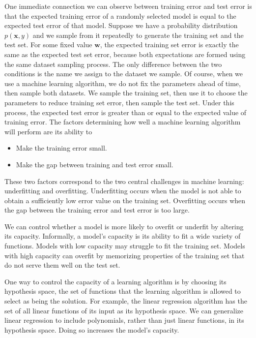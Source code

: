 One immediate connection we can observe between training error and test error is that the expected training error of a randomly selected model is equal to the expected test error of that model. Suppose we have a probability distribution $p(\boldsymbol{x}, y)$ and we sample from it repeatedly to generate the training set and the test set. For some fixed value $\boldsymbol{w}$, the expected training set error is exactly the same as the expected test set error, because both expectations are formed using the same dataset sampling process. The only difference between the two conditions is the name we assign to the dataset we sample. Of course, when we use a machine learning algorithm, we do not fix the parameters ahead of time, then sample both datasets. We sample the training set, then use it to choose the parameters to reduce training set error, then sample the test set. Under this process, the expected test error is greater than or equal to the expected value of training error. The factors determining how well a machine learning algorithm will perform are its ability to
\begin{itemize}
\item Make the training error small.
\item Make the gap between training and test error small.
\end{itemize}
These two factors correspond to the two central challenges in machine learning:
underfitting and overfitting. Underfitting occurs when the model is not able to obtain a sufficiently low error value on the training set. Overfitting occurs when the gap between the training error and test error is too large.

We can control whether a model is more likely to overfit or underfit by altering its capacity. Informally, a model's capacity is its ability to fit a wide variety of functions. Models with low capacity may struggle to fit the training set. Models with high capacity can overfit by memorizing properties of the training set that do not serve them well on the test set.

One way to control the capacity of a learning algorithm is by choosing its hypothesis space, the set of functions that the learning algorithm is allowed to select as being the solution. For example, the linear regression algorithm has the set of all linear functions of its input as its hypothesis space. We can generalize linear regression to include polynomials, rather than just linear functions, in its hypothesis space. Doing so increases the model's capacity.


